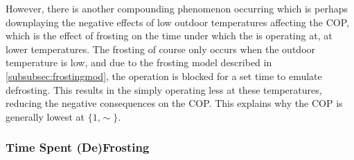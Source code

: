 However, there is another compounding phenomenon occurring which is perhaps downplaying the negative effects of low outdoor temperatures affecting the \ac{COP}, which is the effect of frosting on the time under which the \HP is operating at, at lower temperatures. The frosting of course only occurs when the outdoor temperature is low, and due to the frosting model described in \cref{subsubsec:frostingmod}, the \HP operation is blocked for a set time to emulate defrosting. This results in the \HP simply operating less at these temperatures, reducing the negative consequences on the \ac{COP}. This explains why the \ac{COP} is generally lowest at $\{1\text{,}\sim\}$. 

\subsubsection{Time Spent (De)Frosting}

